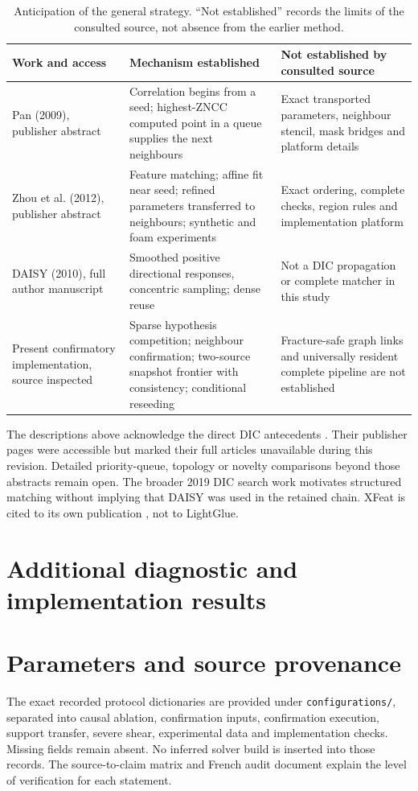 \documentclass[11pt,a4paper]{article}
\begin{document}
\begin{table}[ht]\small\centering
\caption{Anticipation of the general strategy. ``Not established'' records the limits of the consulted source, not absence from the earlier method.}
\begin{tabular}{p{.18\linewidth}p{.35\linewidth}p{.35\linewidth}}\toprule
Work and access & Mechanism established & Not established by consulted source\\\midrule
Pan (2009), publisher abstract & Correlation begins from a seed; highest-ZNCC computed point in a queue supplies the next neighbours & Exact transported parameters, neighbour stencil, mask bridges and platform details\\
Zhou et al. (2012), publisher abstract & Feature matching; affine fit near seed; refined parameters transferred to neighbours; synthetic and foam experiments & Exact ordering, complete checks, region rules and implementation platform\\
DAISY (2010), full author manuscript & Smoothed positive directional responses, concentric sampling; dense reuse & Not a DIC propagation or complete matcher in this study\\
Present confirmatory implementation, source inspected & Sparse hypothesis competition; neighbour confirmation; two-source snapshot frontier with consistency; conditional reseeding & Fracture-safe graph links and universally resident complete pipeline are not established\\\bottomrule
\end{tabular}\end{table}

The descriptions above acknowledge the direct DIC antecedents \citep{pan,zhou}. Their publisher pages were accessible but marked their full articles unavailable during this revision. Detailed priority-queue, topology or novelty comparisons beyond those abstracts remain open. The broader 2019 DIC search work \citep{li} motivates structured matching without implying that DAISY was used in the retained chain. XFeat is cited to its own publication \citep{xfeat}, not to LightGlue.



\section{Additional diagnostic and implementation results}

\section{Parameters and source provenance}
The exact recorded protocol dictionaries are provided under \texttt{configurations/}, separated into causal ablation, confirmation inputs, confirmation execution, support transfer, severe shear, experimental data and implementation checks. Missing fields remain absent. No inferred solver build is inserted into those records. The source-to-claim matrix and French audit document explain the level of verification for each statement.
\end{document}
